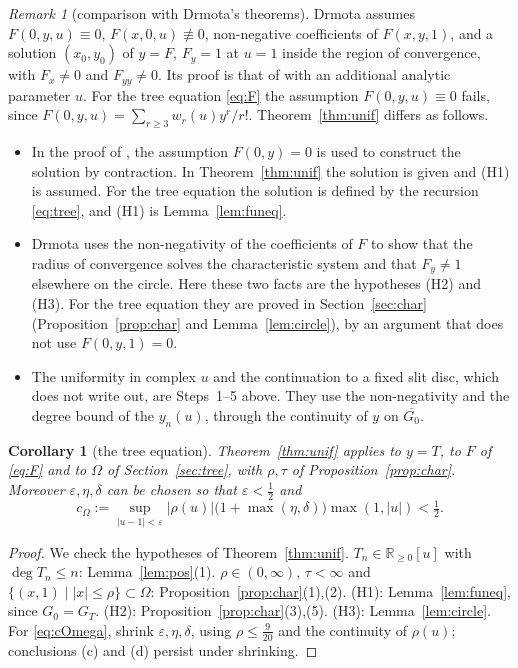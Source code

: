 \documentclass[11pt]{amsart}
\newtheorem{corollary}[theorem]{Corollary}
\theoremstyle{definition}
\theoremstyle{remark}
\newtheorem{remark}[theorem]{Remark}
\numberwithin{equation}{section}
\newcommand{\RR}{\mathbb{R}}
\newcommand{\abs}[1]{\lvert #1\rvert}
\begin{document}
\begin{remark}[comparison with Drmota's theorems]\label{rem:drmota}
Drmota \cite[Thm.~2.21]{Dr} assumes \(F(0,y,u)\equiv0\), \(F(x,0,u)\not\equiv0\), non-negative coefficients of \(F(x,y,1)\), and a solution \((x_0,y_0)\) of \(y=F\), \(F_y=1\) at \(u=1\) inside the region of convergence, with \(F_x\ne0\) and \(F_{yy}\ne0\). Its proof is that of \cite[Thm.~2.19]{Dr} with an additional analytic parameter \(u\). For the tree equation \eqref{eq:F} the assumption \(F(0,y,u)\equiv0\) fails, since \(F(0,y,u)=\sum_{r\ge3}w_r(u)y^r/r!\). Theorem~\ref{thm:unif} differs as follows.
\begin{itemize}
\item In the proof of \cite[Thm.~2.19]{Dr}, the assumption \(F(0,y)=0\) is used to construct the solution by contraction. In Theorem~\ref{thm:unif} the solution is given and (H1) is assumed. For the tree equation the solution is defined by the recursion \eqref{eq:tree}, and (H1) is Lemma~\ref{lem:funeq}.
\item Drmota uses the non-negativity of the coefficients of \(F\) to show that the radius of convergence solves the characteristic system and that \(F_y\ne1\) elsewhere on the circle. Here these two facts are the hypotheses (H2) and (H3). For the tree equation they are proved in Section~\ref{sec:char} (Proposition~\ref{prop:char} and Lemma~\ref{lem:circle}), by an argument that does not use \(F(0,y,1)=0\).
\item The uniformity in complex \(u\) and the continuation to a fixed slit disc, which \cite{Dr} does not write out, are Steps~1--5 above. They use the non-negativity and the degree bound of the \(y_n(u)\), through the continuity of \(y\) on \(\overline{G_0}\).
\end{itemize}
\end{remark}

\begin{corollary}[the tree equation]\label{cor:tree}
Theorem~\ref{thm:unif} applies to \(y=T\), to \(F\) of \eqref{eq:F} and to \(\Omega\) of Section~\ref{sec:tree}, with \(\rho,\tau\) of Proposition~\ref{prop:char}. Moreover \(\varepsilon,\eta,\delta\) can be chosen so that \(\varepsilon<\frac12\) and
\begin{equation}\label{eq:cOmega}
c_\Omega:=\sup_{\abs{u-1}<\varepsilon}\abs{\rho(u)}\bigl(1+\max(\eta,\delta)\bigr)\max(1,\abs{u})<\tfrac12 .
\end{equation}
\end{corollary}

\begin{proof}
We check the hypotheses of Theorem~\ref{thm:unif}. \(T_n\in\RR_{\ge0}[u]\) with \(\deg T_n\le n\): Lemma~\ref{lem:pos}(1). \(\rho\in(0,\infty)\), \(\tau<\infty\) and \(\{(x,1)\mid\abs{x}\le\rho\}\subset\Omega\): Proposition~\ref{prop:char}(1),(2). (H1): Lemma~\ref{lem:funeq}, since \(G_0=G_T\). (H2): Proposition~\ref{prop:char}(3),(5). (H3): Lemma~\ref{lem:circle}. For \eqref{eq:cOmega}, shrink \(\varepsilon,\eta,\delta\), using \(\rho\le\frac9{20}\) and the continuity of \(\rho(u)\); conclusions (c) and (d) persist under shrinking.
\end{proof}
\end{document}
